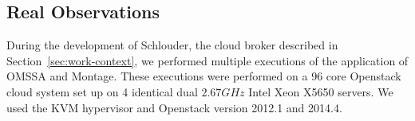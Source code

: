 \documentclass[10pt,conference,compsocconf]{IEEEtran}
\begin{document}

\subsection{Real Observations}


During the development of Schlouder, the cloud broker described in
Section~\ref{sec:work-context}, we performed multiple executions of the
application of OMSSA and Montage. These executions were performed on a 96 core
Openstack cloud system set up on 4 identical dual $2.67GHz$ Intel Xeon X5650
servers. We used the KVM hypervisor and Openstack version 2012.1 and 2014.4.
\end{document}
